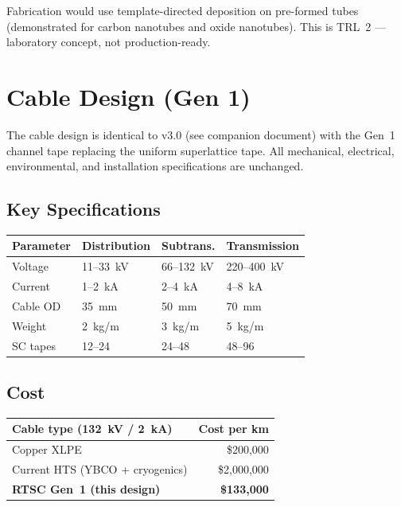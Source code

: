 \documentclass[11pt, a4paper]{article}
\begin{document}
Fabrication would use template-directed deposition on pre-formed
tubes (demonstrated for carbon nanotubes and oxide nanotubes).
This is TRL~2 --- laboratory concept, not production-ready.

\section{Cable Design (Gen 1)}
\label{sec:cable}

The cable design is identical to v3.0 (see companion document) with
the Gen~1 channel tape replacing the uniform superlattice tape. All
mechanical, electrical, environmental, and installation
specifications are unchanged.

\subsection{Key Specifications}

\begin{center}
\begin{tabular}{@{}llll@{}}
\toprule
\textbf{Parameter} & \textbf{Distribution} & \textbf{Subtrans.} &
  \textbf{Transmission} \\
\midrule
Voltage & 11--33~kV & 66--132~kV & 220--400~kV \\
Current & 1--2~kA & 2--4~kA & 4--8~kA \\
Cable OD & 35~mm & 50~mm & 70~mm \\
Weight & 2~kg/m & 3~kg/m & 5~kg/m \\
SC tapes & 12--24 & 24--48 & 48--96 \\
\bottomrule
\end{tabular}
\end{center}

\subsection{Cost}

\begin{center}
\begin{tabular}{@{}lr@{}}
\toprule
\textbf{Cable type (132~kV / 2~kA)} & \textbf{Cost per km} \\
\midrule
Copper XLPE & \$200{,}000 \\
Current HTS (YBCO + cryogenics) & \$2{,}000{,}000 \\
\textbf{RTSC Gen~1 (this design)} & \textbf{\$133{,}000} \\
\bottomrule
\end{tabular}
\end{center}
\end{document}
